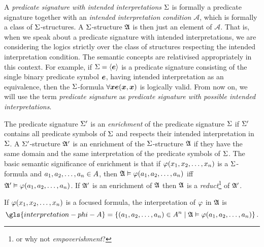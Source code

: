 
A \emph{predicate signature with intended interpretations} $\mathrm{\Sigma}$ is formally a
predicate signature together with an \emph{intended interpretation condition}
$\mathcal{A}$, which is formally a class of $\mathrm{\Sigma}$-structures.
A $\mathrm{\Sigma}$-structure $\mathfrak{A}$ is then just an element of $\mathcal{A}$. That is,
when we speak about a predicate signature with intended interpretations,
we are considering the logics strictly over the class of structures respecting
the intended interpretation condition. The semantic concepts are relativised
appropriately in this context. For example, if $\mathrm{\Sigma} = \left\langle \bm{e} \right\rangle$ is a
predicate signature consisting of the single binary predicate symbol $\bm{e}$,
having intended interpretation as an equivalence, then the $\mathrm{\Sigma}$-formula
$\forall\bm{x} \bm{e}(\bm{x},\bm{x})$ is logically valid.
From now on, we will use the term \emph{predicate signature} as \emph{predicate
signature with possible intended interpretations}.

The predicate signature $\mathrm{\Sigma'}$ is an \emph{enrichment} of the predicate
signature $\mathrm{\Sigma}$ if $\mathrm{\Sigma'}$ contains all predicate symbols of $\mathrm{\Sigma}$ and
respects their intended interpretation in $\mathrm{\Sigma}$. A $\mathrm{\Sigma'}$-structure $\mathfrak{A'}$
is an enrichment of the $\mathrm{\Sigma}$-structure $\mathfrak{A}$ if they have the same domain
and the same interpretation of the predicate symbols of $\mathrm{\Sigma}$.
The basic semantic significance of enrichment is that if
$\varphi(x_{1}, x_{2}, \dots, x_{n})$ is a $\mathrm{\Sigma}$-formula and $a_{1}, a_{2},
\dots, a_{n} \in A$, then $\mathfrak{A} \vDash \varphi(a_{1}, a_{2}, \dots, a_{n})$
iff $\mathfrak{A'} \vDash \varphi(a_{1}, a_{2}, \dots, a_{n})$.
If $\mathfrak{A'}$ is an enrichment of $\mathfrak{A}$ then $\mathfrak{A}$ is a
\emph{reduct}\footnote{or why not \emph{empoverishment}?} of $\mathfrak{A'}$.

If $\varphi(x_{1}, x_{2}, \dots, x_{n})$ is a focused formula, the
interpretation of $\varphi$ in $\mathfrak{A}$ is
\[
  \gls{interpretation-phi-A} = \setbd{(\eaa1, \eaa2, \dots, \eaa\nn) \in
  \domA^\nn}{\StrA \vDash \fphi(\eaa1, \eaa2, \dots, \eaa\nn)}.
\]